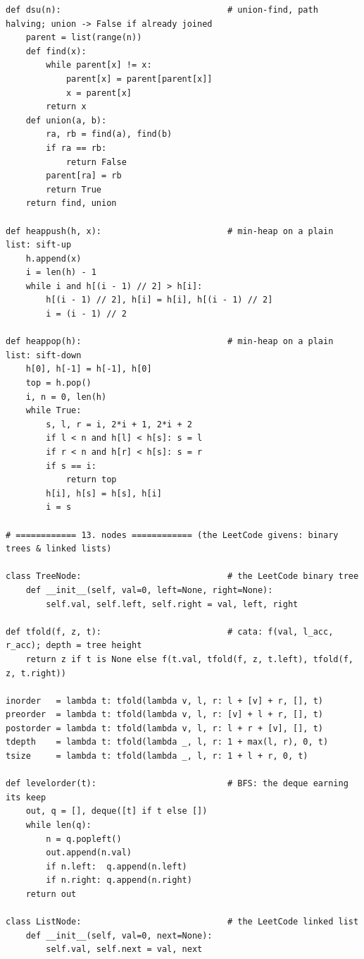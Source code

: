 \documentclass[11pt,letterpaper]{book}
\begin{document}
\begin{lstlisting}[style=file]
def dsu(n):                                 # union-find, path halving; union -> False if already joined
    parent = list(range(n))
    def find(x):
        while parent[x] != x:
            parent[x] = parent[parent[x]]
            x = parent[x]
        return x
    def union(a, b):
        ra, rb = find(a), find(b)
        if ra == rb:
            return False
        parent[ra] = rb
        return True
    return find, union

def heappush(h, x):                         # min-heap on a plain list: sift-up
    h.append(x)
    i = len(h) - 1
    while i and h[(i - 1) // 2] > h[i]:
        h[(i - 1) // 2], h[i] = h[i], h[(i - 1) // 2]
        i = (i - 1) // 2

def heappop(h):                             # min-heap on a plain list: sift-down
    h[0], h[-1] = h[-1], h[0]
    top = h.pop()
    i, n = 0, len(h)
    while True:
        s, l, r = i, 2*i + 1, 2*i + 2
        if l < n and h[l] < h[s]: s = l
        if r < n and h[r] < h[s]: s = r
        if s == i:
            return top
        h[i], h[s] = h[s], h[i]
        i = s

# ============ 13. nodes ============ (the LeetCode givens: binary trees & linked lists)

class TreeNode:                             # the LeetCode binary tree
    def __init__(self, val=0, left=None, right=None):
        self.val, self.left, self.right = val, left, right

def tfold(f, z, t):                         # cata: f(val, l_acc, r_acc); depth = tree height
    return z if t is None else f(t.val, tfold(f, z, t.left), tfold(f, z, t.right))

inorder   = lambda t: tfold(lambda v, l, r: l + [v] + r, [], t)
preorder  = lambda t: tfold(lambda v, l, r: [v] + l + r, [], t)
postorder = lambda t: tfold(lambda v, l, r: l + r + [v], [], t)
tdepth    = lambda t: tfold(lambda _, l, r: 1 + max(l, r), 0, t)
tsize     = lambda t: tfold(lambda _, l, r: 1 + l + r, 0, t)

def levelorder(t):                          # BFS: the deque earning its keep
    out, q = [], deque([t] if t else [])
    while len(q):
        n = q.popleft()
        out.append(n.val)
        if n.left:  q.append(n.left)
        if n.right: q.append(n.right)
    return out

class ListNode:                             # the LeetCode linked list
    def __init__(self, val=0, next=None):
        self.val, self.next = val, next


\end{lstlisting}
\end{document}
